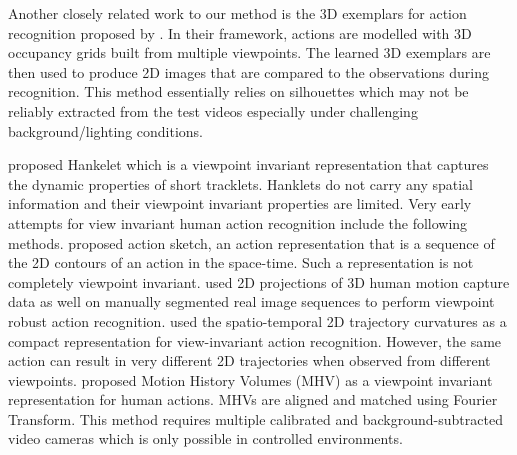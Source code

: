 \documentclass[twocolumn]{svjour3}          \smartqed  \usepackage{graphicx}
\begin{document}
Another closely related work to our method is the 3D exemplars for action recognition proposed by \citet{weinland2007action}. In their framework, actions are modelled with 3D occupancy grids built from multiple viewpoints. The learned 3D exemplars are then used to produce 2D images that are compared to the observations during recognition. This method essentially  relies on silhouettes which may not be reliably extracted from the test videos especially under challenging background/lighting conditions.

\citet{Hankelets} proposed Hankelet which is a viewpoint invariant representation that captures the dynamic properties of short tracklets. Hanklets do not carry any spatial information and their viewpoint invariant properties are limited. Very early attempts for view invariant human action recognition include the following methods. \citet{yilmaz2005actions} proposed action sketch, an action representation that is a sequence of the 2D contours of an action in the  space-time. Such a representation is not completely viewpoint invariant. \citet{parameswaran2006view} used 2D projections of 3D human motion capture data as well on manually segmented real image sequences to perform viewpoint robust action recognition. \citet{rao2002view} used the spatio-temporal 2D trajectory curvatures as a compact representation for view-invariant action recognition. However, the same action can result in very different 2D trajectories when observed from different viewpoints. \citet{weinland2006free} proposed Motion History Volumes (MHV) as a viewpoint invariant representation for human actions. MHVs are aligned and matched using Fourier Transform. This method requires multiple calibrated and background-subtracted video cameras which is only possible in controlled environments. 
\end{document}
